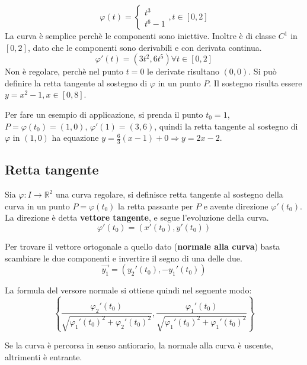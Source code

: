 \begin{example}
\[
	\varphi(t) = \begin{cases} t^3 \\ t^6 - 1 \end{cases}, t\in [0, 2]
\]
La curva è semplice perchè le componenti sono iniettive. Inoltre è di classe $C^1$ in $[0, 2]$, dato che le componenti sono derivabili e con derivata continua.
\[
	\varphi '(t) = (3t^2, 6t^5) \forall t\in [0, 2]
\]
Non è regolare, perchè nel punto $t=0$ le derivate risultano $(0, 0)$. Si può definire la retta tangente al sostegno di $\varphi$ in un punto $P$. Il sostegno risulta essere $y=x^2 - 1, x\in [0, 8]$.

Per fare un esempio di applicazione, si prenda il punto $t_0=1$, $P=\varphi(t_0)=(1, 0)$, $\varphi ' (1) = (3, 6)$, quindi la retta tangente al sostegno di $\varphi$ in $(1, 0)$ ha equazione $y=\frac{6}{3}(x-1)+0 \Rightarrow y = 2x-2$.
\end{example}


\subsection{Retta tangente}
\begin{definition}
Sia $\varphi : I \rightarrow \mathbb{R}^2$ una curva regolare, si definisce retta tangente al sostegno della curva in un punto $P=\varphi(t_0)$ la retta passante per $P$ e avente direzione $\varphi ' (t_0)$. La direzione è detta \textbf{vettore tangente}, e segue l'evoluzione della curva.
\begin{equation}
	\varphi '(t_0) = (x'(t_0), y'(t_0))
\end{equation}

Per trovare il vettore ortogonale a quello dato (\textbf{normale alla curva}) basta scambiare le due componenti e invertire il segno di una delle due.
\begin{equation}
	\vec{y_1}=(y_2'(t_0), -y_1'(t_0))
\end{equation}

La formula del versore normale si ottiene quindi nel seguente modo:
\begin{equation}
	\left\{ \frac{\varphi_2'(t_0)} {\sqrt{\varphi_1'(t_0)^2+\varphi_2'(t_0)^2}} , \frac{\varphi_1'(t_0)}{\sqrt{\varphi_1'(t_0)^2+\varphi_1'(t_0)^2 }} \right\}
\end{equation}

\begin{observation}
Se la curva è percorsa in senso antiorario, la normale alla curva è uscente, altrimenti è entrante.	
\end{observation}


\end{definition}

